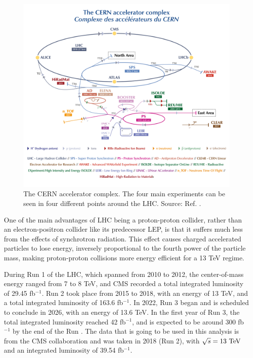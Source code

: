 \begin{figure}[!ht]
    \vspace*{-0.0cm}
    \centering
    \setlength{\mylength}{\textwidth}
    \includegraphics[width=0.84\mylength]{resources/LHC.png}
    \vspace*{-0.0cm}
    \caption{The CERN accelerator complex. The four main experiments can be seen in four different points around the LHC. Source: Ref. \cite{Mobs:2684277}.}
    \label{fig:CERN_LHC}
    \vspace*{-0.3cm}
\end{figure}
One of the main advantages of LHC being a proton-proton collider, rather than an electron-positron collider like its predecessor LEP, is that it suffers much less from the effects of synchrotron radiation. This effect causes charged accelerated particles to lose energy, inversely proportional to the fourth power of the particle mass, making proton-proton collisions more energy efficient for a 13 TeV regime.

During Run 1 of the LHC, which spanned from 2010 to 2012, the center-of-mass energy ranged from 7 to 8 TeV, and CMS recorded a total integrated luminosity of 29.45 fb$^{-1}$. Run 2 took place from 2015 to 2018, with an energy of 13 TeV, and a total integrated luminosity of 163.6 fb$^{-1}$. In 2022, Run 3 began and is scheduled to conclude in 2026, with an energy of 13.6 TeV. In the first year of Run 3, the total integrated luminosity reached 42 fb$^{-1}$, and is expected to be around 300 fb$^{-1}$ by the end of the Run \cite{CMS:luminosity}. The data that is going to be used in this analysis is from the CMS collaboration and was taken in 2018 (Run 2), with $\sqrt{s} = 13\ \text{TeV}$ and an integrated luminosity of 39.54 fb$^{-1}$.

